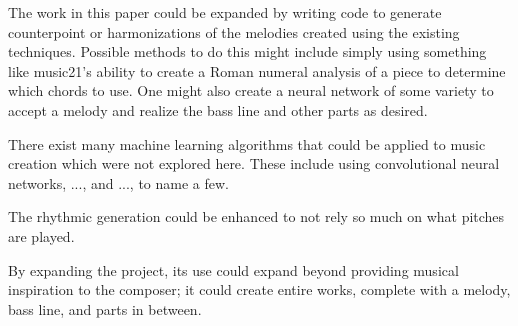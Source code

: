The work in this paper could be expanded by writing code to generate counterpoint or harmonizations of the melodies created using the existing techniques.
Possible methods to do this might include simply using something like music21's ability to create a Roman numeral analysis of a piece to determine which chords to use.
One might also create a neural network of some variety to accept a melody and realize the bass line and other parts as desired.

There exist many machine learning algorithms that could be applied to music creation which were not explored here.
These include using convolutional neural networks, ..., and ..., to name a few.

The rhythmic generation could be enhanced to not rely so much on what pitches are played.

By expanding the project, its use could expand beyond providing musical inspiration to the composer; it could create entire works, complete with a melody, bass line, and parts in between.
